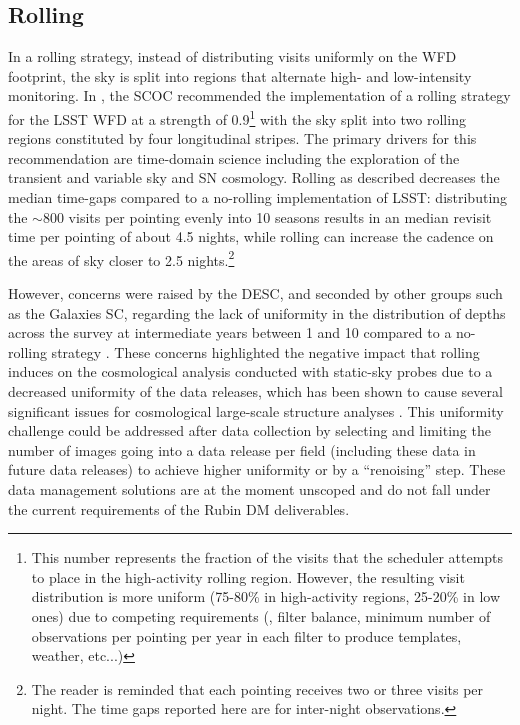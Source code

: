 \subsection{Rolling}\label{sec:rolling}
In a rolling strategy, instead of distributing visits uniformly on the WFD footprint, the sky is split into regions that alternate high- and low-intensity monitoring. In , the SCOC recommended the implementation of a rolling strategy for the LSST WFD at a strength of 0.9\footnote{This number represents the fraction of the visits that the scheduler attempts to place in the high-activity rolling region. However, the resulting visit distribution is more uniform (75-80\% in high-activity regions, 25-20\% in low ones) due to competing requirements (\eg , filter balance, minimum number of observations per pointing per year in each filter to produce templates, weather, etc...)} 
with the sky split into two rolling regions constituted by four longitudinal stripes. The primary drivers for this recommendation are time-domain science including the exploration of the transient and variable sky and SN cosmology. Rolling as described decreases the median time-gaps compared to a no-rolling implementation of LSST:
distributing the $\sim$800 visits per pointing evenly into 10 seasons results in an median revisit time per pointing of about 4.5 nights, while rolling can increase the cadence on the areas of sky closer to 2.5 nights.\footnote{The reader is reminded that each pointing receives two or three visits per night. The time gaps reported here are for inter-night observations.}

 However, concerns were raised by the DESC, and seconded by other groups such as the Galaxies SC, regarding the lack of uniformity in the distribution of depths across the survey at intermediate years between 1 and 10 compared to a no-rolling strategy \citep[see discussion in][which noted this as a potential future concern before the adoption of a rolling cadence as the baseline]{2022ApJS..259...58L}.  These concerns highlighted the negative impact that rolling induces on the cosmological analysis conducted with static-sky probes due to a decreased uniformity of the data releases, which has been shown to cause several significant issues for cosmological large-scale structure analyses \citep[\eg ,][]{2022PhRvD.105b3520A,2023JCAP...07..044B}.  
 This uniformity challenge could be addressed after data collection by selecting and limiting the number of images going into a data release per field (including these data in future data releases) to achieve higher uniformity or by a ``renoising'' step. These data management solutions are at the moment unscoped and do not fall under the current requirements of the Rubin DM deliverables.

